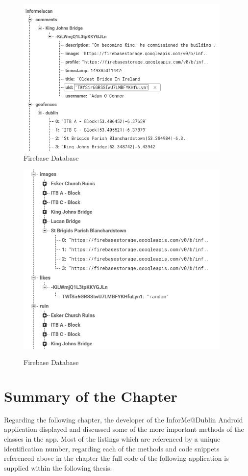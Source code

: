 \begin{figure}[htpb]
	\centering
	\includegraphics[width=300pt]{database1}\\
	\caption{Firebase Database} \label{Figure: Firebase Database}
	
	\includegraphics[width=300pt]{database2}\\
	\caption{Firebase Database} \label{Figure: Firebase Database}
\end{figure}

\newpage

\section{Summary of the Chapter}
Regarding the following chapter, the developer of the InforMe@Dublin Android application displayed and discussed some of the more important methods of the classes in the app. Most of the listings which are referenced by a unique identification number, regarding each of the methods and code snippets referenced above in the chapter the full code of the following application is supplied within the following thesis.

